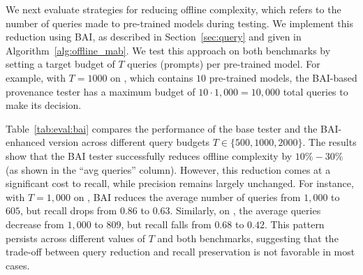 %
%


We next evaluate strategies for reducing offline complexity, which refers to the number of queries made to pre-trained models during testing. We implement this reduction using BAI, as described in Section~\ref{sec:query} and given in Algorithm~\ref{alg:offline_mab}.
%
We test this approach on both benchmarks by setting a target budget of $T$ queries (prompts) per pre-trained model. For example, with $T=1000$ on \bencho, which contains $10$ pre-trained models, the BAI-based provenance tester has a maximum budget of $10 \cdot 1,000 = 10,000$ total queries to make its decision.

Table~\ref{tab:eval:bai} compares the performance of the base tester and the BAI-enhanced version across different query budgets $T\in \{500,1000,2000\}$. The results show that the BAI tester successfully reduces offline complexity by $10\%-30\%$ (as shown in the ``avg queries'' column). However, this reduction comes at a significant cost to recall, while precision remains largely unchanged.
%
For instance, with $T=1,000$ on \bencho, BAI reduces the average number of queries from $1,000$ to $605$, but recall drops from $0.86$ to $0.63$. Similarly, on \bencht, the average queries decrease from $1,000$ to $809$, but recall falls from $0.68$ to $0.42$. This pattern persists across different values of $T$ and both benchmarks, suggesting that the trade-off between query reduction and recall preservation is not favorable in most cases.




